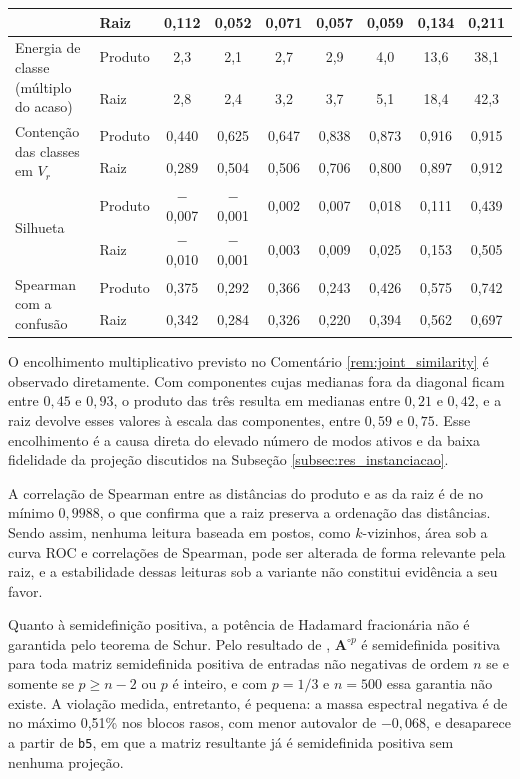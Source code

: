 \begin{table}[pos=htbp]
{\begin{tabular}{llccccccc}
 & Raiz & 0,112 & 0,052 & 0,071 & 0,057 & 0,059 & 0,134 & 0,211 \\
\hline
\multirow{2}{*}{Energia de classe (múltiplo do acaso)} & Produto & 2,3 & 2,1 & 2,7 & 2,9 & 4,0 & 13,6 & 38,1 \\
 & Raiz & 2,8 & 2,4 & 3,2 & 3,7 & 5,1 & 18,4 & 42,3 \\
\hline
\multirow{2}{*}{Contenção das classes em $V_r$} & Produto & 0,440 & 0,625 & 0,647 & 0,838 & 0,873 & 0,916 & 0,915 \\
 & Raiz & 0,289 & 0,504 & 0,506 & 0,706 & 0,800 & 0,897 & 0,912 \\
\hline
\multirow{2}{*}{Silhueta} & Produto & $-$0,007 & $-$0,001 & 0,002 & 0,007 & 0,018 & 0,111 & 0,439 \\
 & Raiz & $-$0,010 & $-$0,001 & 0,003 & 0,009 & 0,025 & 0,153 & 0,505 \\
\hline
\multirow{2}{*}{Spearman com a confusão} & Produto & 0,375 & 0,292 & 0,366 & 0,243 & 0,426 & 0,575 & 0,742 \\
 & Raiz & 0,342 & 0,284 & 0,326 & 0,220 & 0,394 & 0,562 & 0,697 \\
\hline
\end{tabular}}
\end{table}

O encolhimento multiplicativo previsto no Comentário \ref{rem:joint_similarity} é observado diretamente. Com componentes cujas medianas fora da diagonal ficam entre $0{,}45$ e $0{,}93$, o produto das três resulta em medianas entre $0{,}21$ e $0{,}42$, e a raiz devolve esses valores à escala das componentes, entre $0{,}59$ e $0{,}75$. Esse encolhimento é a causa direta do elevado número de modos ativos e da baixa fidelidade da projeção discutidos na Subseção \ref{subsec:res_instanciacao}.

A correlação de Spearman entre as distâncias do produto e as da raiz é de no mínimo $0{,}9988$, o que confirma que a raiz preserva a ordenação das distâncias. Sendo assim, nenhuma leitura baseada em postos, como $k$-vizinhos, área sob a curva ROC e correlações de Spearman, pode ser alterada de forma relevante pela raiz, e a estabilidade dessas leituras sob a variante não constitui evidência a seu favor.

Quanto à semidefinição positiva, a potência de Hadamard fracionária não é garantida pelo teorema de Schur. Pelo resultado de \citet{FitzGeraldHorn1977}, $\mathbf{A}^{\circ p}$ é semidefinida positiva para toda matriz semidefinida positiva de entradas não negativas de ordem $n$ se e somente se $p \geq n-2$ ou $p$ é inteiro, e com $p = 1/3$ e $n = 500$ essa garantia não existe. A violação medida, entretanto, é pequena: a massa espectral negativa é de no máximo 0,51\% nos blocos rasos, com menor autovalor de $-0{,}068$, e desaparece a partir de \texttt{b5}, em que a matriz resultante já é semidefinida positiva sem nenhuma projeção.


